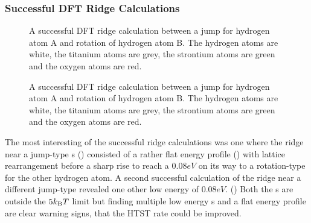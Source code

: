 \subsubsection{Successful DFT Ridge Calculations}
\begin{figure}[h]
\begin{center}
    \parbox{0.85\linewidth}{
      \caption{A successful DFT ridge calculation between a jump  for hydrogen atom A and rotation of hydrogen atom B.
The hydrogen atoms are white, the titanium atoms are grey, the strontium atoms are green and the oxygen atoms are red.
      }
      \label{fig:semi-results}
    }
\end{center}
\end{figure}
\begin{figure}[h]
\begin{center}
    \parbox{0.85\linewidth}{
      \caption{A successful DFT ridge calculation between a jump  for hydrogen atom A and rotation of hydrogen atom B.
The hydrogen atoms are white, the titanium atoms are grey, the strontium atoms are green and the oxygen atoms are red.
      }
      \label{fig:jump-results}
    }
\end{center}
\end{figure}
The most interesting of the successful ridge calculations was one where the ridge near a jump-type s () consisted of a rather flat energy profile () with lattice rearrangement before a sharp rise to reach a $0.08\unit{eV}$  on its way to a rotation-type  for the other hydrogen atom.
A second successful calculation of the ridge near a different jump-type  revealed one other low energy  of $0.08\unit{eV}$. ()
Both the s are outside the $5k_\text{B} T$ limit but finding multiple low energy s and a flat energy profile are clear warning signs, that the HTST rate could be improved.


